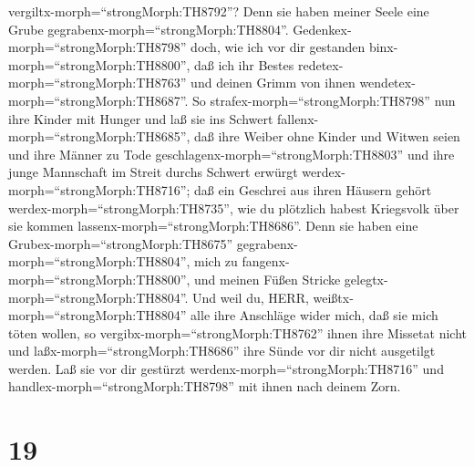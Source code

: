 vergiltx-morph=``strongMorph:TH8792''? Denn sie haben meiner Seele eine
Grube gegrabenx-morph=``strongMorph:TH8804''.
Gedenkex-morph=``strongMorph:TH8798'' doch, wie ich vor dir gestanden
binx-morph=``strongMorph:TH8800'', daß ich ihr Bestes
redetex-morph=``strongMorph:TH8763'' und deinen Grimm von ihnen
wendetex-morph=``strongMorph:TH8687''.  So
strafex-morph=``strongMorph:TH8798'' nun ihre Kinder mit Hunger und laß
sie ins Schwert fallenx-morph=``strongMorph:TH8685'', daß ihre Weiber
ohne Kinder und Witwen seien und ihre Männer zu Tode
geschlagenx-morph=``strongMorph:TH8803'' und ihre junge Mannschaft im
Streit durchs Schwert erwürgt werdex-morph=``strongMorph:TH8716'';
 daß ein Geschrei aus ihren Häusern gehört
werdex-morph=``strongMorph:TH8735'', wie du plötzlich habest Kriegsvolk
über sie kommen lassenx-morph=``strongMorph:TH8686''. Denn sie haben
eine Grubex-morph=``strongMorph:TH8675''
gegrabenx-morph=``strongMorph:TH8804'', mich zu
fangenx-morph=``strongMorph:TH8800'', und meinen Füßen Stricke
gelegtx-morph=``strongMorph:TH8804''.  Und weil du, HERR,
weißtx-morph=``strongMorph:TH8804'' alle ihre Anschläge wider mich, daß
sie mich töten wollen, so vergibx-morph=``strongMorph:TH8762'' ihnen
ihre Missetat nicht und laßx-morph=``strongMorph:TH8686'' ihre Sünde vor
dir nicht ausgetilgt werden. Laß sie vor dir gestürzt
werdenx-morph=``strongMorph:TH8716'' und
handlex-morph=``strongMorph:TH8798'' mit ihnen nach deinem Zorn.

\hypertarget{section-18}{%
\section{19}\label{section-18}}

